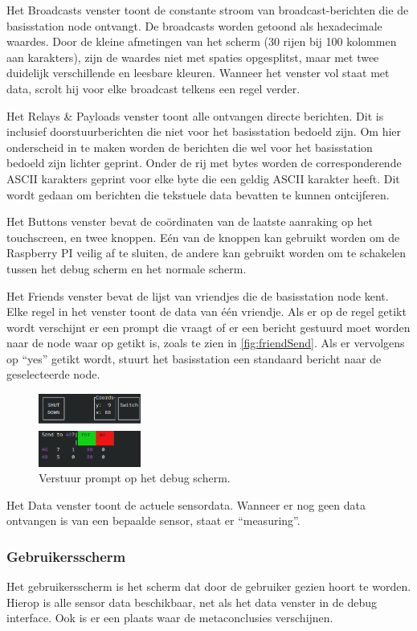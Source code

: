 Het Broadcasts venster toont de constante stroom van broadcast-berichten die de basisstation node ontvangt. De broadcasts worden getoond als hexadecimale waardes. Door de kleine afmetingen van het scherm (30 rijen bij 100 kolommen aan karakters), zijn de waardes niet met spaties opgesplitst, maar met twee duidelijk verschillende en leesbare kleuren. Wanneer het venster vol staat met data, scrolt hij voor elke broadcast telkens een regel verder.

Het Relays \& Payloads venster toont alle ontvangen directe berichten. Dit is inclusief doorstuurberichten die niet voor het basisstation bedoeld zijn. Om hier onderscheid in te maken worden de berichten die wel voor het basisstation bedoeld zijn lichter geprint. Onder de rij met bytes worden de corresponderende ASCII karakters geprint voor elke byte die een geldig ASCII karakter heeft. Dit wordt gedaan om berichten die tekstuele data bevatten te kunnen ontcijferen.

Het Buttons venster bevat de coördinaten van de laatste aanraking op het touchscreen, en twee knoppen. Eén van de knoppen kan gebruikt worden om de Raspberry PI veilig af te sluiten, de andere kan gebruikt worden om te schakelen tussen het debug scherm en het normale scherm.

Het Friends venster bevat de lijst van vriendjes die de basisstation node kent. Elke regel in het venster toont de data van één vriendje. Als er op de regel getikt wordt verschijnt er een prompt die vraagt of er een bericht gestuurd moet worden naar de node waar op getikt is, zoals te zien in \autoref{fig:friendSend}. Als er vervolgens op ``yes'' getikt wordt, stuurt het basisstation een standaard bericht naar de geselecteerde node.

\begin{figure}[ht]
    \centering
    \includegraphics[width=0.3\textwidth]{img/prompt.png}
    \caption{Verstuur prompt op het debug scherm.}
    \label{fig:friendSend}
\end{figure}

Het Data venster toont de actuele sensordata. Wanneer er nog geen data ontvangen is van een bepaalde sensor, staat er ``measuring''.

\subsubsection*{Gebruikersscherm}
Het gebruikersscherm is het scherm dat door de gebruiker gezien hoort te worden. Hierop is alle sensor data beschikbaar, net als het data venster in de debug interface. Ook is er een plaats waar de metaconclusies verschijnen.




